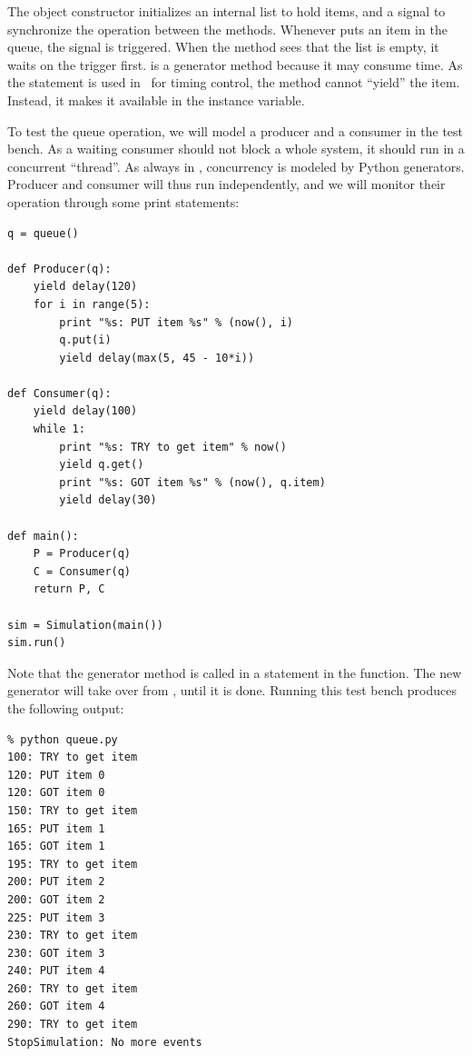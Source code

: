 The  object constructor initializes an internal list to
hold items, and a  signal to synchronize the operation
between the methods. Whenever  puts an item in the
queue, the signal is triggered.  When the  method sees
that the list is empty, it waits on the trigger first.
 is a generator method because 
it may consume time. As the  statement is used in \myhdl\
for timing control, the method cannot ``yield'' the item. Instead, it
makes it available in the \var{item} instance variable.

To test the queue operation, we will model a producer and a consumer
in the test bench.  As a waiting consumer should not block a whole
system, it should run in a concurrent ``thread''. As always in
\myhdl{}, concurrency is modeled by Python generators. Producer
and consumer will thus run independently, and we will monitor
their operation through some print statements:

\begin{verbatim}
q = queue()

def Producer(q):
    yield delay(120)
    for i in range(5):
        print "%s: PUT item %s" % (now(), i)
        q.put(i)
        yield delay(max(5, 45 - 10*i))

def Consumer(q):
    yield delay(100)
    while 1:
        print "%s: TRY to get item" % now()
        yield q.get()
        print "%s: GOT item %s" % (now(), q.item)
        yield delay(30)

def main():
    P = Producer(q)
    C = Consumer(q)
    return P, C 

sim = Simulation(main())
sim.run()
\end{verbatim}

Note that the generator method  is called in a
 statement in the  function. The new
generator will take over from \function{Consumer}, until it is done.
Running this test bench produces the following output:

\begin{verbatim}
% python queue.py
100: TRY to get item
120: PUT item 0
120: GOT item 0
150: TRY to get item
165: PUT item 1
165: GOT item 1
195: TRY to get item
200: PUT item 2
200: GOT item 2
225: PUT item 3
230: TRY to get item
230: GOT item 3
240: PUT item 4
260: TRY to get item
260: GOT item 4
290: TRY to get item
StopSimulation: No more events
\end{verbatim}
